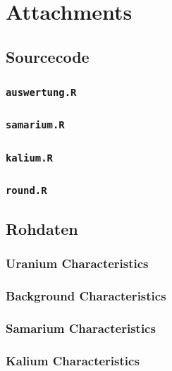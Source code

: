 \documentclass[12pt]{article}
\newcommand{\code}[1]{\texttt{#1}}
\begin{document}
\newpage
\section{Attachments}









\subsection{Sourcecode}

\subsubsection{\code{auswertung.R}}\label{auswertung.R}

\subsubsection{\code{samarium.R}}\label{samarium.R}

\subsubsection{\code{kalium.R}}\label{kalium.R}

\subsubsection{\code{round.R}}\label{round.R}


\subsection{Rohdaten}
\subsubsection{Uranium Characteristics}

\subsubsection{Background Characteristics}

\subsubsection{Samarium Characteristics}

\subsubsection{Kalium Characteristics}

\end{document}
